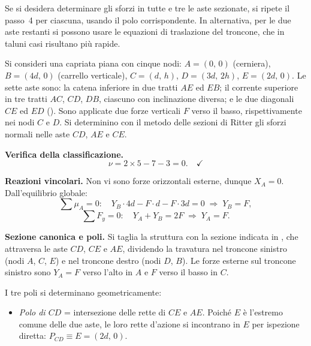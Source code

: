 Se si desidera determinare gli sforzi in tutte e tre
le aste sezionate, si ripete il passo~4 per ciascuna,
usando il polo corrispondente. In alternativa, per
le due aste restanti si possono usare le equazioni
di traslazione del troncone, che in taluni casi
risultano più rapide.

\begin{esempio}
	Si consideri una capriata piana con cinque nodi:
	$A = (0,\,0)$ (cerniera), $B = (4d,\,0)$
	(carrello verticale), $C = (d,\,h)$,
	$D = (3d,\,2h)$, $E = (2d,\,0)$.
	Le sette aste sono: la catena inferiore in due
	tratti $AE$ ed $EB$; il corrente superiore
	in tre tratti $AC$, $CD$, $DB$, ciascuno con
	inclinazione diversa; e le due diagonali $CE$
	ed $ED$ ().
	Sono applicate due forze verticali $F$ verso
	il basso, rispettivamente nei nodi $C$ e $D$.
	Si determinino con il metodo delle sezioni di
	Ritter gli sforzi normali nelle aste $CD$,
	$AE$ e $CE$.
	
	\begin{svolgimento}
		



		
		\noindent\textbf{Verifica della classificazione.}
		\[
		\nu = 2 \times 5 - 7 - 3 = 0. \quad\checkmark
		\]
		
		\noindent\textbf{Reazioni vincolari.}
		Non vi sono forze orizzontali esterne, dunque
		$X_A = 0$. Dall'equilibrio globale:
		\[
		\sum \mu_A = 0:\quad
		Y_B \cdot 4d - F \cdot d - F \cdot 3d = 0
		\;\Rightarrow\; Y_B = F,
		\]
		\[
		\sum F_y = 0:\quad
		Y_A + Y_B = 2F
		\;\Rightarrow\; Y_A = F.
		\]
		
		\noindent\textbf{Sezione canonica e poli.}
		Si taglia la struttura con la sezione indicata in
		, che attraversa
		le aste $CD$, $CE$ e $AE$, dividendo la travatura
		nel troncone sinistro (nodi $A$, $C$, $E$) e nel
		troncone destro (nodi $D$, $B$). Le forze esterne
		sul troncone sinistro sono $Y_A = F$ verso l'alto
		in $A$ e $F$ verso il basso in $C$.
		
		I tre poli si determinano geometricamente:
		
		\begin{itemize}[noitemsep]
			\item \emph{Polo di $CD$} = intersezione delle
			rette di $CE$ e $AE$. Poiché $E$ è l'estremo
			comune delle due aste, le loro rette d'azione
			si incontrano in $E$ per ispezione diretta:
			$P_{CD} \equiv E = (2d,\,0)$.
			

\end{itemize}
\end{svolgimento}
\end{esempio}
